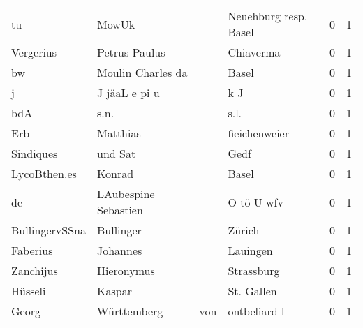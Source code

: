 \begin{tabular}{llllrr}
                       tu &                              MowUk &             &                       Neuehburg resp. Basel &          0 &         1 \\
                Vergerius &                      Petrus Paulus &             &                                   Chiaverma &          0 &         1 \\
                       bw &                  Moulin Charles da &             &                                       Basel &          0 &         1 \\
                        j &                      J jäaL e pi u &             &                                         k J &          0 &         1 \\
                      bdA &                               s.n. &             &                                        s.l. &          0 &         1 \\
                      Erb &                           Matthias &             &                               fieichenweier &          0 &         1 \\
                Sindiques &                            und Sat &             &                                        Gedf &          0 &         1 \\
             LycoBthen.es &                             Konrad &             &                                       Basel &          0 &         1 \\
                       de &               LAubespine Sebastien &             &                                  O tö U wfv &          0 &         1 \\
           BullingervSSna &                          Bullinger &             &                                      Zürich &          0 &         1 \\
                 Faberius &                           Johannes &             &                                    Lauingen &          0 &         1 \\
                Zanchijus &                         Hieronymus &             &                                  Strassburg &          0 &         1 \\
                  Hüsseli &                             Kaspar &             &                                  St. Gallen &          0 &         1 \\
                    Georg &                        Württemberg &         von &                                ontbeliard l &          0 &         1 \\

\end{tabular}
